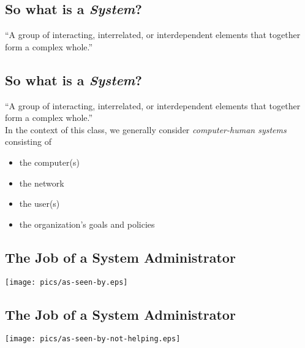 \documentclass[xga]{xdvislides}
\begin{document}
\subsection{So what is a {\em System}?}
``A group of interacting, interrelated, or interdependent elements that
together form a complex whole.''


\subsection{So what is a {\em System}?}
``A group of interacting, interrelated, or interdependent elements that
together form a complex whole.''
\\

In the context of this class, we generally consider {\em computer-human
systems} consisting of

\begin{itemize}
	\item the computer(s)
	\item the network
\end{itemize}
\vspace{.2in}

\begin{itemize}
	\item the user(s)
	\item the organization's goals and policies
\end{itemize}

\subsection{The Job of a System Administrator}
\vspace*{\fill}
\begin{center}
	\texttt{[image: pics/as-seen-by.eps]} \\
\end{center}
\vspace*{\fill}

\subsection{The Job of a System Administrator}
\vspace*{\fill}
\begin{center}
	\texttt{[image: pics/as-seen-by-not-helping.eps]} \\
\end{center}
\vspace*{\fill}
\end{document}
